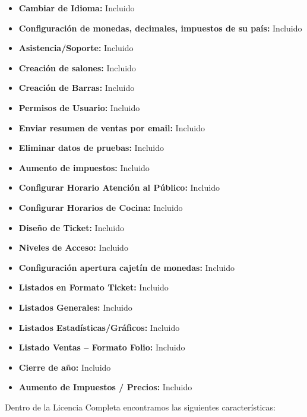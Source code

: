 \documentclass[12pt,a4paper]{article}
\begin{document}
\begin{itemize}
\item \textbf {Cambiar de Idioma:} Incluido
\item \textbf {Configuración de monedas, decimales, impuestos de su país:} Incluido
\item \textbf {Asistencia/Soporte:} Incluido
\item \textbf {Creación de salones:} Incluido
\item \textbf {Creación de Barras:} Incluido
\item \textbf {Permisos de Usuario:} Incluido
\item \textbf {Enviar resumen de ventas por email:} Incluido
\item \textbf {Eliminar datos de pruebas:} Incluido
\item \textbf {Aumento de impuestos:} Incluido
\item \textbf {Configurar Horario Atención al Público:} Incluido
\item \textbf {Configurar Horarios de Cocina:} Incluido
\item \textbf {Diseño de Ticket: }Incluido
\item \textbf {Niveles de Acceso:} Incluido
\item \textbf {Configuración apertura cajetín de monedas:} Incluido
\item \textbf {Listados en Formato Ticket:} Incluido
\item \textbf {Listados Generales:} Incluido
\item \textbf {Listados Estadísticas/Gráficos:} Incluido
\item \textbf {Listado Ventas – Formato Folio:} Incluido
\item \textbf {Cierre de año:} Incluido
\item \textbf {Aumento de Impuestos / Precios:} Incluido
\end{itemize}

Dentro de la Licencia Completa encontramos las siguientes características:
\end{document}

